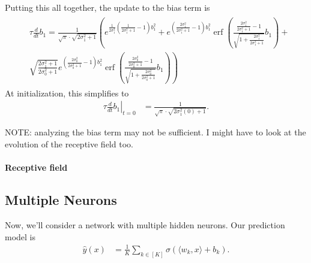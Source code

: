 \documentclass{article}
\begin{document}
Putting this all together, the update to the bias term is
\begin{align}
  &\begin{multlined}
    \tau \frac{d}{d t} b_1 = \frac{1}{\sqrt{\pi}\cdot\sqrt{2\sigma_{1}^{2}+1}}\left(e^{\frac{1}{2\sigma_{1}^{2}}\left(\frac{1}{2\sigma_{1}^{2}+1}-1\right)b_{1}^{2}}+e^{\left(\frac{2\sigma_{1}^{2}}{2\sigma_{1}^{2}+1}-1\right)b_{1}^{2}}\operatorname{erf}\left(\frac{\frac{2\sigma_{1}^{2}}{2\sigma_{1}^{2}+1}-1}{\sqrt{1+\frac{2\sigma_{1}^{2}}{2\sigma_{1}^{2}+1}}}b_{1}\right)+ \right. \\
    \left. \sqrt{\frac{2\sigma_{1}^{2}+1}{2\sigma_{0}^{2}+1}}e^{\left(\frac{2\sigma_{0}^{2}}{2\sigma_{0}^{2}+1}-1\right)b_{1}^{2}}\operatorname{erf}\left(\frac{\frac{2\sigma_{0}^{2}}{2\sigma_{0}^{2}+1}-1}{\sqrt{1+\frac{2\sigma_{0}^{2}}{2\sigma_{0}^{2}+1}}}b_{1}\right)\right)
  \end{multlined}
\end{align}
At initialization, this simplifies to
\begin{align}
  \tau \left. \frac{d}{d t} b_1 \right|_{t=0} &= \frac{1}{\sqrt{\pi}\cdot\sqrt{2\sigma_{1}^{2}(0)+1}}.
\end{align}

NOTE: analyzing the bias term may not be sufficient.
I might have to look at the evolution of the receptive field too.

\paragraph*{Receptive field}


\subsection*{Multiple Neurons}
Now, we'll consider a network with multiple hidden neurons.
Our prediction model is
\begin{align*}
  \hat{y}(x) &= \frac{1}{K} \sum_{k \in [K]} \sigma( \langle w_k, x \rangle + b_k ).
\end{align*}
\end{document}
